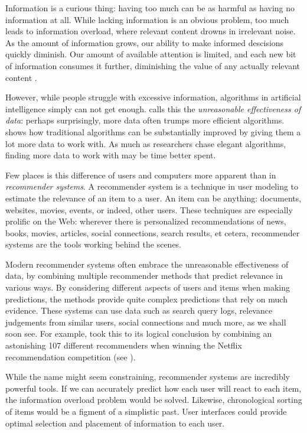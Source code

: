 \label{chap:intro}

Information is a curious thing:
having too much can be as harmful as having no information at all.
While lacking information is an obvious problem,
too much leads to information overload,
where relevant content drowns in irrelevant noise.
As the amount of information grows,
our ability to make informed descisions quickly diminish.
Our amount of available attention is limited, and each new bit
of information consumes it further,
diminishing the value of any actually relevant content
\cite[p1]{Davenport2001}.

However, while people struggle with excessive information,
algorithms in artificial intelligence simply can not get enough.
\citet[p1]{Halevy2009} calls this the \emph{unreasonable effectiveness of data}:
perhaps surprisingly, more data often trumps more efficient algorithms.
\citet[p3]{Banko2001} shows how traditional algorithms can be substantially
improved by giving them a lot more data to work with.
As much as researchers chase elegant algorithms,
finding more data to work with may be time better spent.

Few places is this difference of users and computers more apparent than in \emph{recommender systems}.
A recommender system is a technique in user modeling to estimate the relevance of an item to a user.
An item can be anything: documents, websites, movies, events, or indeed, other users.
These techniques are especially prolific on the Web: 
wherever there is personalized recommendations of news, books, movies,
articles, social connections, search results, et cetera, recommender systems are the tools
working behind the scenes.

Modern recommender systems often embrace the unreasonable effectiveness of data,
by combining multiple recommender methods that predict relevance in various ways.
By considering different aspects of users and items when making predictions,
the methods provide quite complex predictions that rely on much evidence.
These systems can use data such as search query logs, relevance judgements from similar users,
social connections and much more, as we shall soon see.
For example, \citet[p1]{Bell2007} took this to its logical conclusion by 
combining an astonishing 107 different recommenders when winning the Netflix recommendation competition
(see \citet{Linden2009}).

While the name might seem constraining, recommender systems are incredibly powerful tools.
If we can accurately predict how each user will react to each item, the information overload problem would be solved.
Likewise, chronological sorting of items would be a figment of a simplistic past.
User interfaces could provide optimal selection and placement of information to each user.

